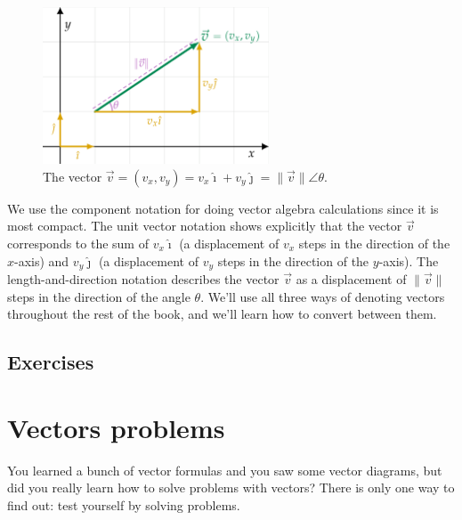 			\begin{figure}[htb]
				\centering
				\includegraphics[width=0.6\textwidth]{images/figures/vectors/vector_components_annotated.png}
				\vspace{-2mm}
				\caption{The vector $\vec{v}=(v_x,v_y) = v_x\hat{\imath}+ v_y\hat{\jmath} = \|\vec{v}\|\angle \theta$.\label{fig:vector_components_annotated}}
				
			\end{figure}

			\noindent
			We use the component notation for doing vector algebra calculations since it is most compact.
			The unit vector notation shows explicitly that the vector $\vec{v}$ corresponds to the sum of
			$v_x\hat{\imath}$ (a displacement of $v_x$ steps in the direction of the $x$-axis)
			and $v_y\hat{\jmath}$ (a displacement of $v_y$ steps in the direction of the $y$-axis).
			The length-and-direction notation describes the vector $\vec{v}$
			as a displacement of $\|\vec{v}\|$ steps in the direction of the angle $\theta$.
			We'll use all three ways of denoting vectors throughout the rest of the book,
			and we'll learn how to convert between them.


	\subsection{Exercises}
	\label{basis:exercises}

		


\section{Vectors problems}
\label{sec:vec_problems}

\vspace{-2mm}

You learned a bunch of vector formulas and you saw some vector diagrams,
but did you really learn how to solve problems with vectors?
There is only one way to find out: test yourself by solving problems.

